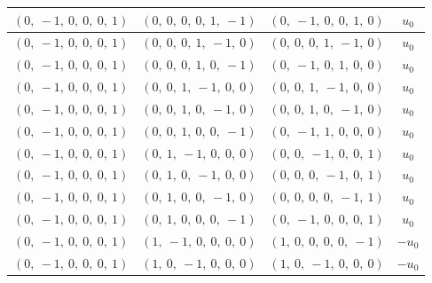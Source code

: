\documentclass[11pt]{article}
\theoremstyle{definition}
\begin{document}
\begin{longtable}{|l|l|l|c|}
    \hline
    $\left( 0, \  -1, \  0, \  0, \  0, \  1\right)$ & $\left( 0, \  0, \  0, \  0, \  1, \  -1\right)$ & $\left( 0, \  -1, \  0, \  0, \  1, \  0\right)$ & $u_{0}$ \\
    \hline
    $\left( 0, \  -1, \  0, \  0, \  0, \  1\right)$ & $\left( 0, \  0, \  0, \  1, \  -1, \  0\right)$ & $\left( 0, \  0, \  0, \  1, \  -1, \  0\right)$ & $u_{0}$ \\
    \hline
    $\left( 0, \  -1, \  0, \  0, \  0, \  1\right)$ & $\left( 0, \  0, \  0, \  1, \  0, \  -1\right)$ & $\left( 0, \  -1, \  0, \  1, \  0, \  0\right)$ & $u_{0}$ \\
    \hline
    $\left( 0, \  -1, \  0, \  0, \  0, \  1\right)$ & $\left( 0, \  0, \  1, \  -1, \  0, \  0\right)$ & $\left( 0, \  0, \  1, \  -1, \  0, \  0\right)$ & $u_{0}$ \\
    \hline
    $\left( 0, \  -1, \  0, \  0, \  0, \  1\right)$ & $\left( 0, \  0, \  1, \  0, \  -1, \  0\right)$ & $\left( 0, \  0, \  1, \  0, \  -1, \  0\right)$ & $u_{0}$ \\
    \hline
    $\left( 0, \  -1, \  0, \  0, \  0, \  1\right)$ & $\left( 0, \  0, \  1, \  0, \  0, \  -1\right)$ & $\left( 0, \  -1, \  1, \  0, \  0, \  0\right)$ & $u_{0}$ \\
    \hline
    $\left( 0, \  -1, \  0, \  0, \  0, \  1\right)$ & $\left( 0, \  1, \  -1, \  0, \  0, \  0\right)$ & $\left( 0, \  0, \  -1, \  0, \  0, \  1\right)$ & $u_{0}$ \\
    \hline
    $\left( 0, \  -1, \  0, \  0, \  0, \  1\right)$ & $\left( 0, \  1, \  0, \  -1, \  0, \  0\right)$ & $\left( 0, \  0, \  0, \  -1, \  0, \  1\right)$ & $u_{0}$ \\
    \hline
    $\left( 0, \  -1, \  0, \  0, \  0, \  1\right)$ & $\left( 0, \  1, \  0, \  0, \  -1, \  0\right)$ & $\left( 0, \  0, \  0, \  0, \  -1, \  1\right)$ & $u_{0}$ \\
    \hline
    $\left( 0, \  -1, \  0, \  0, \  0, \  1\right)$ & $\left( 0, \  1, \  0, \  0, \  0, \  -1\right)$ & $\left( 0, \  -1, \  0, \  0, \  0, \  1\right)$ & $u_{0}$ \\
    \hline
    $\left( 0, \  -1, \  0, \  0, \  0, \  1\right)$ & $\left( 1, \  -1, \  0, \  0, \  0, \  0\right)$ & $\left( 1, \  0, \  0, \  0, \  0, \  -1\right)$ & $- u_{0}$ \\
    \hline
    $\left( 0, \  -1, \  0, \  0, \  0, \  1\right)$ & $\left( 1, \  0, \  -1, \  0, \  0, \  0\right)$ & $\left( 1, \  0, \  -1, \  0, \  0, \  0\right)$ & $- u_{0}$ \\

\end{longtable}
\end{document}
